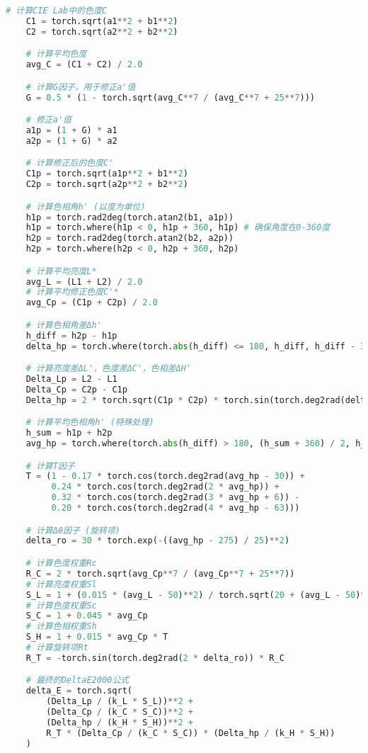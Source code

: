 \begin{lstlisting}[language=Python]
    # 计算CIE Lab中的色度C
    C1 = torch.sqrt(a1**2 + b1**2)
    C2 = torch.sqrt(a2**2 + b2**2)

    # 计算平均色度
    avg_C = (C1 + C2) / 2.0

    # 计算G因子，用于修正a'值
    G = 0.5 * (1 - torch.sqrt(avg_C**7 / (avg_C**7 + 25**7)))

    # 修正a'值
    a1p = (1 + G) * a1
    a2p = (1 + G) * a2

    # 计算修正后的色度C'
    C1p = torch.sqrt(a1p**2 + b1**2)
    C2p = torch.sqrt(a2p**2 + b2**2)

    # 计算色相角h' (以度为单位)
    h1p = torch.rad2deg(torch.atan2(b1, a1p))
    h1p = torch.where(h1p < 0, h1p + 360, h1p) # 确保角度在0-360度
    h2p = torch.rad2deg(torch.atan2(b2, a2p))
    h2p = torch.where(h2p < 0, h2p + 360, h2p)

    # 计算平均亮度L*
    avg_L = (L1 + L2) / 2.0
    # 计算平均修正色度C'*
    avg_Cp = (C1p + C2p) / 2.0

    # 计算色相角差Δh'
    h_diff = h2p - h1p
    delta_hp = torch.where(torch.abs(h_diff) <= 180, h_diff, h_diff - 360 * torch.sign(h_diff))

    # 计算亮度差ΔL'，色度差ΔC'，色相差ΔH'
    Delta_Lp = L2 - L1
    Delta_Cp = C2p - C1p
    Delta_hp = 2 * torch.sqrt(C1p * C2p) * torch.sin(torch.deg2rad(delta_hp / 2.0))

    # 计算平均色相角h' (特殊处理)
    h_sum = h1p + h2p
    avg_hp = torch.where(torch.abs(h_diff) > 180, (h_sum + 360) / 2, h_sum / 2)

    # 计算T因子
    T = (1 - 0.17 * torch.cos(torch.deg2rad(avg_hp - 30)) +
         0.24 * torch.cos(torch.deg2rad(2 * avg_hp)) +
         0.32 * torch.cos(torch.deg2rad(3 * avg_hp + 6)) -
         0.20 * torch.cos(torch.deg2rad(4 * avg_hp - 63)))

    # 计算Δθ因子 (旋转项)
    delta_ro = 30 * torch.exp(-((avg_hp - 275) / 25)**2)

    # 计算色度权重Rc
    R_C = 2 * torch.sqrt(avg_Cp**7 / (avg_Cp**7 + 25**7))
    # 计算亮度权重Sl
    S_L = 1 + (0.015 * (avg_L - 50)**2) / torch.sqrt(20 + (avg_L - 50)**2)
    # 计算色度权重Sc
    S_C = 1 + 0.045 * avg_Cp
    # 计算色相权重Sh
    S_H = 1 + 0.015 * avg_Cp * T
    # 计算旋转项Rt
    R_T = -torch.sin(torch.deg2rad(2 * delta_ro)) * R_C

    # 最终的DeltaE2000公式
    delta_E = torch.sqrt(
        (Delta_Lp / (k_L * S_L))**2 +
        (Delta_Cp / (k_C * S_C))**2 +
        (Delta_hp / (k_H * S_H))**2 +
        R_T * (Delta_Cp / (k_C * S_C)) * (Delta_hp / (k_H * S_H))
    )


\end{lstlisting}
